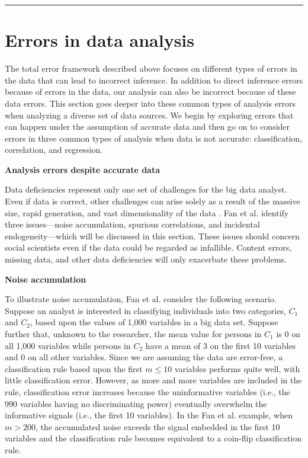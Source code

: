 \documentclass[]{krantz}
\begin{document}
\begin{center}\rule{0.5\linewidth}{\linethickness}\end{center}

\hypertarget{sec:10-4}{\section{Errors in data
analysis}\label{sec:10-4}}

The total error framework described above focuses on different types of
errors in the data that can lead to incorrect inference. In addition to
direct inference errors because of errors in the data, our analysis can
also be incorrect because of these data errors. This section goes deeper
into these common types of analysis errors when analyzing a diverse set
of data sources. We begin by exploring errors that can happen under the
assumption of accurate data and then go on to consider errors in three
common types of analysis when data is not accurate: classification,
correlation, and regression.

\textbf{Analysis errors despite accurate data}

Data deficiencies represent only one set of challenges for the big data
analyst. Even if data is correct, other challenges can arise solely as a
result of the massive size, rapid generation, and vast dimensionality of
the data \citep{meng2018}. Fan et al. \citeyearpar{fan2014challenges}
identify three issues---noise accumulation, spurious correlations, and
incidental endogeneity---which will be discussed in this section. These
issues should concern social scientists even if the data could be
regarded as infallible. Content errors, missing data, and other data
deficiencies will only exacerbate these problems.

\textbf{Noise accumulation}

To illustrate noise accumulation, Fan et al.
\citeyearpar{fan2014challenges} consider the following scenario. Suppose
an analyst is interested in classifying individuals into two categories,
\(C_{1}\) and \(C_{2}\), based upon the values of 1,000 variables in a
big data set. Suppose further that, unknown to the researcher, the mean
value for persons in \(C_{1}\) is 0 on all 1,000 variables while persons
in \(C_{2}\) have a mean of 3 on the first 10 variables and 0 on all
other variables. Since we are assuming the data are error-free, a
classification rule based upon the first \(m \le 10\) variables performs
quite well, with little classification error. However, as more and more
variables are included in the rule, classification error increases
because the uninformative variables (i.e., the 990 variables having no
discriminating power) eventually overwhelm the informative signals
(i.e., the first 10 variables). In the Fan et al.
\citeyearpar{fan2014challenges} example, when \(m > 200\), the
accumulated noise exceeds the signal embedded in the first 10 variables
and the classification rule becomes equivalent to a coin-flip
classification rule.
\end{document}
